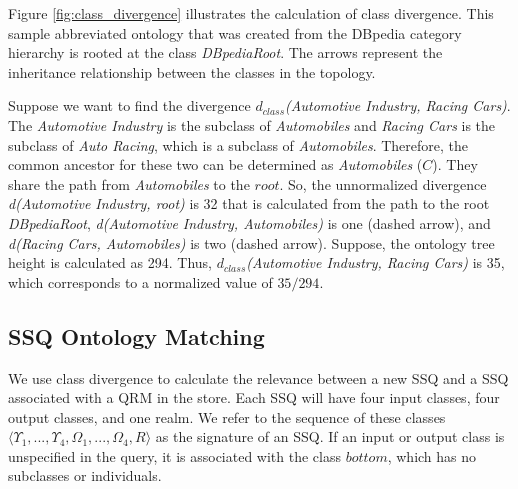 Figure \ref{fig:class_divergence} illustrates the calculation of class
divergence. This sample abbreviated ontology that was created from the
DBpedia category hierarchy is rooted at the class
\textit{DBpediaRoot}. The arrows represent the inheritance
relationship between the classes in the topology.

Suppose we want to find the divergence $d_{class}$\textit{(Automotive
  Industry, Racing Cars)}. The \textit{Automotive Industry} is the
subclass of \textit{Automobiles} and \textit{Racing Cars} is the
subclass of \textit{Auto Racing}, which is a subclass of \textit{Automobiles}. Therefore, the common ancestor for
these two can be determined as \textit{Automobiles} ($C$). They share
the path from \textit{Automobiles} to the $root$. So, the unnormalized
divergence \textit{d(Automotive Industry, root)} is 32 that is calculated from the path to the root \textit{DBpediaRoot}, \textit{d(Automotive Industry, Automobiles)} is one
(dashed arrow), and \textit{d(Racing Cars, Automobiles)} is two
(dashed arrow). Suppose, the ontology tree height is calculated as
294. Thus, $d_{class}$\textit{(Automotive Industry, Racing Cars)} is 35, which corresponds to a normalized value of $35/294$.

\subsection{SSQ Ontology Matching}
\label{sec:oqom}

We use class divergence to calculate the relevance between a new 
SSQ and a SSQ associated with a QRM in the store.  Each SSQ will have four input classes, four output classes, and one realm.  We refer to the
sequence of these classes $\langle \Upsilon_1, ..., \Upsilon_4,
\Omega_1, ..., \Omega_4, R \rangle$ as the signature of an SSQ. If an
input or output class is unspecified in the query, it is associated
with the class $bottom$, which has no subclasses or individuals.

